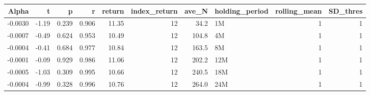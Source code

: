 \begin{table}[ht]
\centering
\begin{tabular}{rrrrrrrlrr}
  \hline
Alpha & t & p & r & return & index\_return & ave\_N & holding\_period & rolling\_mean & SD\_thres \\ 
  \hline
-0.0030 & -1.19 & 0.239 & 0.906 & 11.35 & 12 & 34.2 & 1M &  1 &  1 \\ 
  -0.0007 & -0.49 & 0.624 & 0.953 & 10.49 & 12 & 104.8 & 4M &  1 &  1 \\ 
  -0.0004 & -0.41 & 0.684 & 0.977 & 10.84 & 12 & 163.5 & 8M &  1 &  1 \\ 
  -0.0001 & -0.09 & 0.929 & 0.986 & 11.06 & 12 & 202.2 & 12M &  1 &  1 \\ 
  -0.0005 & -1.03 & 0.309 & 0.995 & 10.66 & 12 & 240.5 & 18M &  1 &  1 \\ 
  -0.0004 & -0.99 & 0.328 & 0.996 & 10.76 & 12 & 264.0 & 24M &  1 &  1 \\ 
   \hline
\end{tabular}
\end{table}

